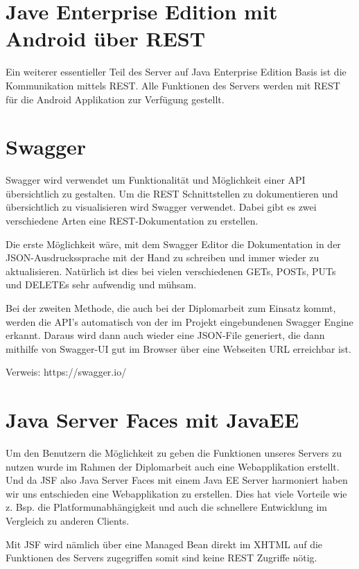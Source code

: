 \section{Jave Enterprise Edition mit Android über REST}\label{sec:javaeeandroidrest}
Ein weiterer essentieller Teil des Server auf Java Enterprise Edition Basis ist die Kommunikation mittels REST. Alle Funktionen des Servers werden mit REST für die Android Applikation zur Verfügung gestellt. 

\section{Swagger}\label{sec:javaeeandroidrestswagger}
Swagger wird verwendet um Funktionalität und Möglichkeit einer API übersichtlich zu gestalten. Um die REST Schnittstellen zu dokumentieren und übersichtlich zu visualisieren wird Swagger verwendet. Dabei gibt es zwei verschiedene Arten eine REST-Dokumentation zu erstellen. 

Die erste Möglichkeit wäre, mit dem Swagger Editor die Dokumentation in der JSON-Ausdruckssprache mit der Hand zu schreiben und immer wieder zu aktualisieren. Natürlich ist dies bei vielen verschiedenen GETs, POSTs, PUTs und DELETEs sehr aufwendig und mühsam.

Bei der zweiten Methode, die auch bei der Diplomarbeit zum Einsatz kommt, werden die API's automatisch von der im Projekt eingebundenen Swagger Engine erkannt. Daraus wird dann auch wieder eine JSON-File generiert, die dann mithilfe von Swagger-UI gut im Browser über eine Webseiten URL erreichbar ist.


Verweis: https://swagger.io/

\section{Java Server Faces mit JavaEE}\label{sec:javaeejsf}
Um den Benutzern die Möglichkeit zu geben die Funktionen unseres Servers zu nutzen wurde im Rahmen der Diplomarbeit auch eine Webapplikation erstellt. Und da JSF also Java Server Faces mit einem Java EE Server harmoniert haben wir  uns entschieden eine Webapplikation zu erstellen. Dies hat viele Vorteile wie z. Bsp. die Platformunabhängigkeit und auch die schnellere Entwicklung im Vergleich zu anderen Clients. 

Mit JSF wird nämlich über eine Managed Bean direkt im XHTML auf die Funktionen des Servers zugegriffen somit sind keine REST Zugriffe nötig. 

